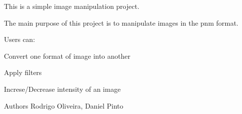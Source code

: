 This is a simple image manipulation project.

The main purpose of this project is to manipulate images in the pnm format.

Users can\+:
\begin{DoxyItemize}
\item Convert one format of image into another 
\item Apply filters 
\item Increse/\+Decrease intensity of an image 
\end{DoxyItemize}

\begin{DoxyAuthor}{Authors}
Rodrigo Oliveira, Daniel Pinto 
\end{DoxyAuthor}
